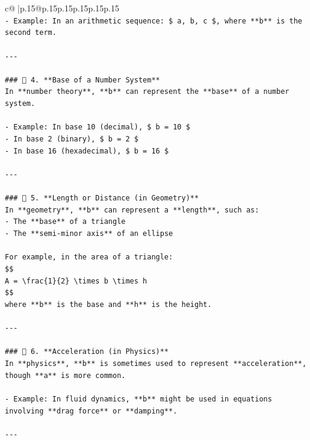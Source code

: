 \documentclass{article}
\begin{document}
{\begin{supertabular}{c@{$\;$}|p{.15\linewidth}@{}p{.15\linewidth}p{.15\linewidth}p{.15\linewidth}p{.15\linewidth}p{.15\linewidth}}
{{{\\ 
\texttt{{-} Example: In an arithmetic sequence: \$ a, b, c \$, where **b** is the second term.} \\
\\ 
\texttt{{-}{-}{-}} \\
\\ 
\texttt{\#\#\# 🔹 4. **Base of a Number System**} \\
\texttt{In **number theory**, **b** can represent the **base** of a number system.} \\
\\ 
\texttt{{-} Example: In base 10 (decimal), \$ b = 10 \$} \\
\texttt{{-} In base 2 (binary), \$ b = 2 \$} \\
\texttt{{-} In base 16 (hexadecimal), \$ b = 16 \$} \\
\\ 
\texttt{{-}{-}{-}} \\
\\ 
\texttt{\#\#\# 🔹 5. **Length or Distance (in Geometry)**} \\
\texttt{In **geometry**, **b** can represent a **length**, such as:} \\
\texttt{{-} The **base** of a triangle} \\
\texttt{{-} The **semi{-}minor axis** of an ellipse} \\
\\ 
\texttt{For example, in the area of a triangle:} \\
\texttt{\$\$} \\
\texttt{A = \textbackslash{}frac\{1\}\{2\} \textbackslash{}times b \textbackslash{}times h} \\
\texttt{\$\$} \\
\texttt{where **b** is the base and **h** is the height.} \\
\\ 
\texttt{{-}{-}{-}} \\
\\ 
\texttt{\#\#\# 🔹 6. **Acceleration (in Physics)**} \\
\texttt{In **physics**, **b** is sometimes used to represent **acceleration**, though **a** is more common.} \\
\\ 
\texttt{{-} Example: In fluid dynamics, **b** might be used in equations involving **drag force** or **damping**.} \\
\\ 
\texttt{{-}{-}{-}} \\
}}}
\end{supertabular}}
\end{document}
